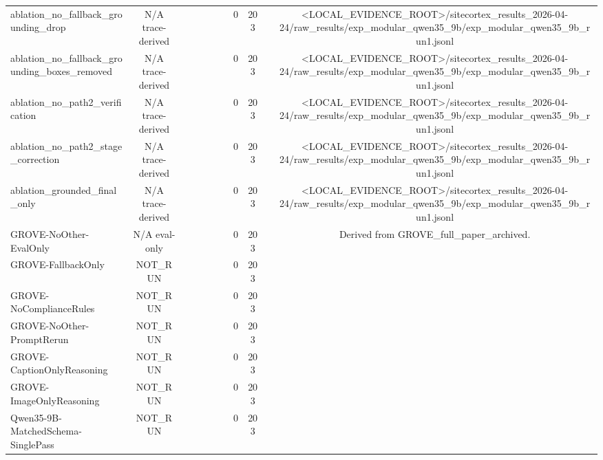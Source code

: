 \begin{table}[t]
{\begin{tabular}{lcccccccccc}
ablation\_no\_fallback\_grounding\_drop & N/A trace-derived &  &  &  &  &  & 0 & 203 &  & <LOCAL_EVIDENCE_ROOT>/sitecortex\_results\_2026-04-24/raw\_results/exp\_modular\_qwen35\_9b/exp\_modular\_qwen35\_9b\_run1.jsonl \\
ablation\_no\_fallback\_grounding\_boxes\_removed & N/A trace-derived &  &  &  &  &  & 0 & 203 &  & <LOCAL_EVIDENCE_ROOT>/sitecortex\_results\_2026-04-24/raw\_results/exp\_modular\_qwen35\_9b/exp\_modular\_qwen35\_9b\_run1.jsonl \\
ablation\_no\_path2\_verification & N/A trace-derived &  &  &  &  &  & 0 & 203 &  & <LOCAL_EVIDENCE_ROOT>/sitecortex\_results\_2026-04-24/raw\_results/exp\_modular\_qwen35\_9b/exp\_modular\_qwen35\_9b\_run1.jsonl \\
ablation\_no\_path2\_stage\_correction & N/A trace-derived &  &  &  &  &  & 0 & 203 &  & <LOCAL_EVIDENCE_ROOT>/sitecortex\_results\_2026-04-24/raw\_results/exp\_modular\_qwen35\_9b/exp\_modular\_qwen35\_9b\_run1.jsonl \\
ablation\_grounded\_final\_only & N/A trace-derived &  &  &  &  &  & 0 & 203 &  & <LOCAL_EVIDENCE_ROOT>/sitecortex\_results\_2026-04-24/raw\_results/exp\_modular\_qwen35\_9b/exp\_modular\_qwen35\_9b\_run1.jsonl \\
GROVE-NoOther-EvalOnly & N/A eval-only &  &  &  &  &  & 0 & 203 &  & Derived from GROVE\_full\_paper\_archived. \\
GROVE-FallbackOnly & NOT\_RUN &  &  &  &  &  & 0 & 203 &  &  \\
GROVE-NoComplianceRules & NOT\_RUN &  &  &  &  &  & 0 & 203 &  &  \\
GROVE-NoOther-PromptRerun & NOT\_RUN &  &  &  &  &  & 0 & 203 &  &  \\
GROVE-CaptionOnlyReasoning & NOT\_RUN &  &  &  &  &  & 0 & 203 &  &  \\
GROVE-ImageOnlyReasoning & NOT\_RUN &  &  &  &  &  & 0 & 203 &  &  \\
Qwen35-9B-MatchedSchema-SinglePass & NOT\_RUN &  &  &  &  &  & 0 & 203 &  &  \\
\bottomrule
\end{tabular}
}
\end{table}
